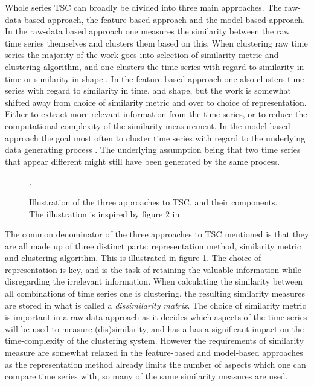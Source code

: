 Whole series TSC can broadly be divided into three main approaches. 
The raw-data based approach, the feature-based approach and the model based approach. 
In the raw-data based approach one measures the similarity between the raw time series themselves and clusters them based on this. 
When clustering raw time series the majority of the work goes into selection of similarity metric and clustering algorithm, and one clusters the time series with regard to similarity in time or similarity in shape \cite{tsc_rev}. 
In the feature-based approach one also clusters time series with regard to similarity in time, and shape, but the work is somewhat shifted away from choice of similarity metric and over to choice of representation. 
Either to extract more relevant information from the time series, or to reduce the computational complexity of the similarity measurement. 
In the model-based approach the goal most often to cluster time series with regard to the underlying data generating process \cite{moar_mpl_tsc}.
The underlying assumption being that two time series that appear different might still have been generated by the same process.

\begin{figure}
    \begin{center}
    
    \end{center}
    \caption{Illustration of the three approaches to TSC, and their components. The illustration is inspired by figure 2 in \textcite{tsc_rev}}.
    \label{fig:tsc_approaches}
\end{figure}

The common denominator of the three approaches to TSC mentioned is that they are all made up of three distinct parts: representation method, similarity metric and clustering algorithm. 
This is illustrated in figure \ref{fig:tsc_approaches}.
The choice of representation is key, and is the task of retaining the valuable information while disregarding the irrelevant information. 
When calculating the similarity between all combinations of time series one is clustering, the resulting similarity measures are stored in what is called a \textit{dissimilarity matrix}.
The choice of similarity metric is important in a raw-data approach as it decides which aspects of the time series will be used to measure (dis)similarity, and has a has a significant impact on the time-complexity of the clustering system. 
However the requirements of similarity measure are somewhat relaxed in the feature-based and model-based approaches as the representation method already limits the number of aspects which one can compare time series with, so many of the same similarity measures are used.

